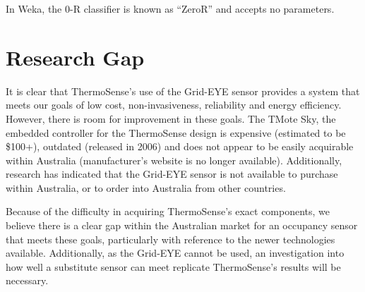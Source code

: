 \documentclass[../thesis/thesis.tex]{subfiles}
\begin{document}
In Weka, the 0-R classifier is known as ``ZeroR'' and accepts no parameters.

\section{Research Gap}
It is clear that ThermoSense's use of the Grid-EYE sensor provides a system that meets our goals of low cost, non-invasiveness, reliability and energy efficiency. However, there is room for improvement in these goals. The TMote Sky, the embedded controller for the ThermoSense design is expensive (estimated to be \$100+), outdated (released in 2006) and does not appear to be easily acquirable within Australia (manufacturer's website is no longer available). Additionally, research has indicated that the Grid-EYE sensor is not available to purchase within Australia, or to order into Australia from other countries.

Because of the difficulty in acquiring ThermoSense's exact components, we believe there is a clear gap within the Australian market for an occupancy sensor that meets these goals, particularly with reference to the newer technologies available. Additionally, as the Grid-EYE cannot be used, an investigation into how well a substitute sensor can meet replicate ThermoSense's results will be necessary.


\end{document}

